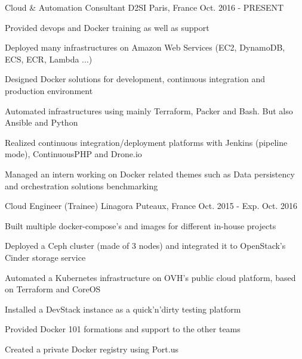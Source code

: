 

\begin{cventries}

  \cventry
    {Cloud \& Automation Consultant} %
    {D2SI} %
    {Paris, France} %
    {Oct. 2016 - PRESENT} %
    {
      \begin{cvitems} %
        \item {Provided devops and Docker training as well as support}
        \item {Deployed many infrastructures on Amazon Web Services (EC2, DynamoDB, ECS, ECR, Lambda ...)}
        \item {Designed Docker solutions for development, continuous integration and production environment}
        \item {Automated infrastructures using mainly Terraform, Packer and Bash. But also Ansible and Python}
        \item {Realized continuous integration/deployment platforms with Jenkins (pipeline mode), ContinuousPHP and Drone.io}
        \item {Managed an intern working on Docker related themes such as Data persistency and orchestration solutions benchmarking}
      \end{cvitems}
    }

  \cventry
    {Cloud Engineer (Trainee)} %
    {Linagora} %
    {Puteaux, France} %
    {Oct. 2015 - Exp. Oct. 2016} %
    {
      \begin{cvitems} %
        \item {Built multiple docker-compose's and images for different in-house projects}
        \item {Deployed a Ceph cluster (made of 3 nodes) and integrated it to OpenStack's Cinder storage service}
        \item {Automated a Kubernetes infrastructure on OVH's public cloud platform, based on Terraform and CoreOS}
        \item {Installed a DevStack instance as a quick'n'dirty testing platform}
        \item {Provided Docker 101 formations and support to the other teams}
        \item {Created a private Docker registry using Port.us}
      \end{cvitems}
    }


\end{cventries}
